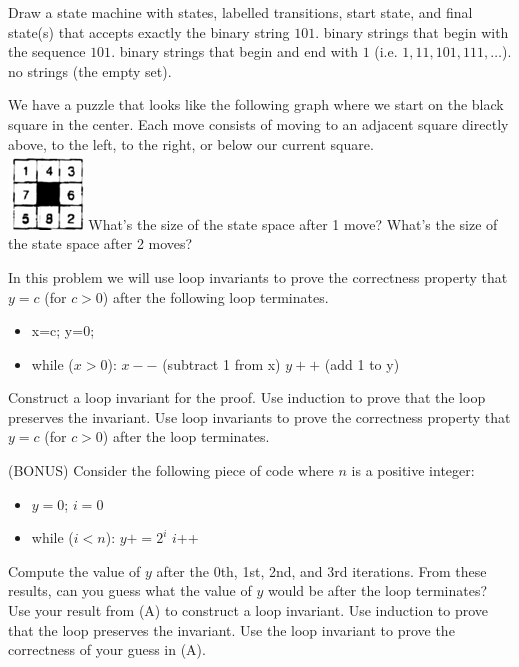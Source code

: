 \documentclass[solution, letterpaper]{cs20inclass}
\begin{document}
\pagebreak

\problem Draw a state machine with states, labelled transitions, start state, and final state(s) that accepts exactly
\subproblem the binary string $101$.
\subproblem binary strings that begin with the sequence $101$.
\subproblem binary strings that begin and end with $1$ (i.e. $1, 11, 101, 111,\ldots$).
\subproblem no strings (the empty set).

\problem We have a puzzle that looks like the following graph where we start on the black square in the center. Each move consists of moving to an adjacent square directly above, to the left, to the right, or below our current square.\\
\includegraphics[width=2cm]{initial}
\subproblem What's the size of the state space after 1 move?
\subproblem What's the size of the state space after 2 moves?

\problem In this problem we will use loop invariants to prove the correctness property that $y=c$ (for $c>0$) after the following loop terminates.
\begin{itemize}
\item x=c; y=0;
\item while ($x>0$):
\subitem $x--$ (subtract 1 from x)
\subitem $y++$ (add 1 to y)
\end{itemize}
\subproblem Construct a loop invariant for the proof.
\subproblem Use induction to prove that the loop preserves the invariant.
\subproblem Use loop invariants to prove the correctness property that $y=c$ (for $c>0$) after the loop terminates.

\problem (BONUS) Consider the following piece of code where $n$ is a positive integer:
\begin{itemize}
\item $y=0$; $i=0$
\item while ($i< n$):
\subitem $y += 2^i$
\subitem $i$++
\end{itemize}
\subproblem Compute the value of $y$ after the 0th, 1st, 2nd, and 3rd iterations. From these results, can you guess what the value of $y$ would be after the loop terminates?
\subproblem Use your result from (A) to construct a loop invariant.
\subproblem Use induction to prove that the loop preserves the invariant.
\subproblem Use the loop invariant to prove the correctness of your guess in (A).
\end{document}
